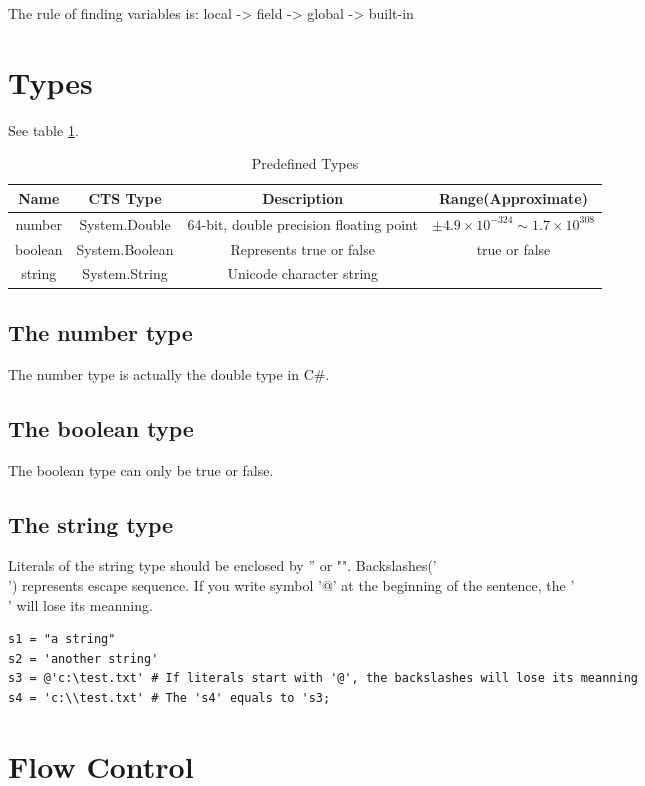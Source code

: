 The rule of finding variables is: local -> field -> global -> built-in

\section{Types}
See table \ref{predefined_types}.
\begin{table}
	\begin{tabular}{|c|c|c|c|}
		\hline
		Name & CTS Type & Description & Range(Approximate)  \\ 
		\hline
		number & System.Double & 64-bit, double precision floating point & $ \pm 4.9 \times 10 ^ {-324} \sim 1.7 \times 10 ^ {308} $ \\
		boolean & System.Boolean & Represents true or false & true or false \\
		string & System.String & Unicode character string & \\
		\hline
	\end{tabular}
	\label{predefined_types}
	\caption{Predefined Types}
\end{table}

\subsection{The number type}
The number type is actually the double type in C\#.
\subsection{The boolean type}
The boolean type can only be true or false.
\subsection{The string type}
Literals of the string type should be enclosed by '' or "". Backslashes('\\') represents escape sequence. If you write symbol '@' at the beginning of the sentence, the '\\' will lose its meanning.
\begin{lstlisting}
s1 = "a string"
s2 = 'another string'
s3 = @'c:\test.txt' # If literals start with '@', the backslashes will lose its meanning
s4 = 'c:\\test.txt' # The 's4' equals to 's3;
\end{lstlisting}

\section{Flow Control}
